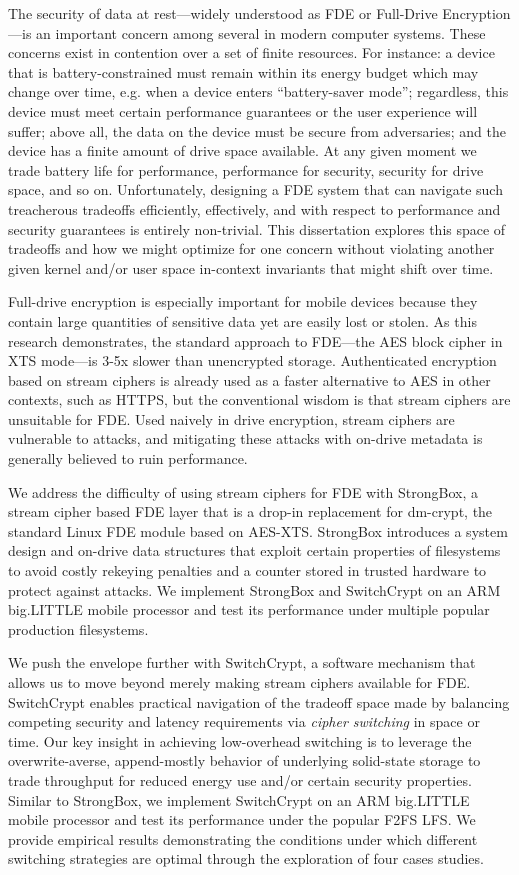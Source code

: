 \abstract
The security of data at rest---widely understood as FDE or Full-Drive
Encryption---is an important concern among several in modern computer systems.
These concerns exist in contention over a set of finite resources. For instance:
a device that is battery-constrained must remain within its energy budget which
may change over time, e.g. when a device enters ``battery-saver mode'';
regardless, this device must meet certain performance guarantees or the user
experience will suffer; above all, the data on the device must be secure from
adversaries; and the device has a finite amount of drive space available. At any
given moment we trade battery life for performance, performance for security,
security for drive space, and so on. Unfortunately, designing a FDE system that
can navigate such treacherous tradeoffs efficiently, effectively, and with
respect to performance and security guarantees is entirely non-trivial. This
dissertation explores this space of tradeoffs and how we might optimize for one
concern without violating another given kernel and/or user space in-context
invariants that might shift over time.

Full-drive encryption is especially important for mobile devices because they
contain large quantities of sensitive data yet are easily lost or stolen. As
this research demonstrates, the standard approach to FDE—the AES block cipher in
XTS mode—is 3-5x slower than unencrypted storage. Authenticated encryption based
on stream ciphers is already used as a faster alternative to AES in other
contexts, such as HTTPS, but the conventional wisdom is that stream ciphers are
unsuitable for FDE. Used naively in drive encryption, stream ciphers are
vulnerable to attacks, and mitigating these attacks with on-drive metadata is
generally believed to ruin performance.

We address the difficulty of using stream ciphers for FDE with StrongBox, a
stream cipher based FDE layer that is a drop-in replacement for dm-crypt, the
standard Linux FDE module based on AES-XTS. StrongBox introduces a system design
and on-drive data structures that exploit certain properties of filesystems to
avoid costly rekeying penalties and a counter stored in trusted hardware to
protect against attacks. We implement StrongBox and SwitchCrypt on an ARM
big.LITTLE mobile processor and test its performance under multiple popular
production filesystems.

We push the envelope further with SwitchCrypt, a software mechanism that allows
us to move beyond merely making stream ciphers available for FDE. SwitchCrypt
enables practical navigation of the tradeoff space made by balancing competing
security and latency requirements via \emph{cipher switching} in space or time.
Our key insight in achieving low-overhead switching is to leverage the
overwrite-averse, append-mostly behavior of underlying solid-state storage to
trade throughput for reduced energy use and/or certain security properties.
Similar to StrongBox, we implement SwitchCrypt on an ARM big.LITTLE mobile
processor and test its performance under the popular F2FS LFS. We provide
empirical results demonstrating the conditions under which different switching
strategies are optimal through the exploration of four cases studies.

